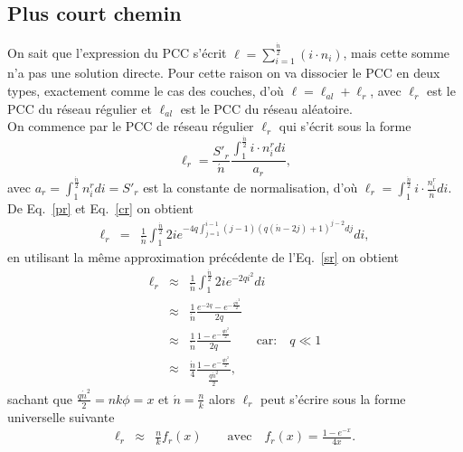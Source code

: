 \subsection{Plus court chemin}
On sait que l'expression du PCC s'écrit  $\ell=\sum_{i=1}^{\frac{\acute{n}}{2}}(i\cdot n_i)$, mais cette somme n'a pas une solution 
directe. Pour cette raison on va dissocier le PCC en deux types, exactement comme le cas des couches, d'où $\ell=\ell_{al}+\ell_r$, avec $\ell_r$ est le PCC du réseau régulier  et $\ell_{al}$ est le PCC du réseau aléatoire.\\
On commence par le PCC de réseau régulier $\ell_r$ qui s'écrit sous la forme 
\begin{equation}
\ell_r=\frac{S'_r}{\acute{n}}\frac{\int_1^{\frac{\acute{n}}{2}}i\cdot n_{i}^{r}di}{a_r},
\end{equation}
avec $a_r=\int_1^{\frac{\acute{n}}{2}}n_{i}^{r}di=S'_r$
est la constante de normalisation, d'où $\ell_r=\int_1^{\frac{\acute{n}}{2}}i\cdot\frac{n_{i}^{r}}{\acute{n}}di$.\\
De Eq.~\eqref{pr} et Eq.~\eqref{cr} on obtient
\begin{eqnarray}
\ell_r&=&\frac{1}{\acute{n}}\int^{\frac{\acute{n}}{2}}_1 2ie^{-4q\int_{j=1}^{i-1}(j-1)(q(\acute{n}-2j)+1)^{j-2}dj}di,\nonumber
\end{eqnarray}
en utilisant la m\^{e}me approximation précédente de l'Eq.~\eqref{sr} on obtient
\begin{eqnarray}
\ell_r &\approx&\frac{1}{\acute{n}}\int_1^{\frac{\acute{n}}{2}}2ie^{-2qi^2}di \\\nonumber
&\approx&\frac{1}{\acute{n}}\frac{e^{-2q}-e^{-\frac{q\acute{n}^2}{2}}}{2q}\\\nonumber
&\approx&\frac{1}{\acute{n}}\frac{1-e^{-\frac{q\acute{n}^2}{2}}}{2q} \quad \quad  \text{car:} \quad q\ll1 \\\nonumber
&\approx&\frac{\acute{n}}{4}\frac{1-e^{-\frac{q\acute{n}^2}{2}}}{\frac{q\acute{n}^2}{2}},\nonumber
\end{eqnarray}
sachant que $\frac{q\acute{n}^2}{2}=nk\phi=x$ et $\acute{n}=\frac{n}{k}$ alors $\ell_r$ peut s'écrire sous la forme universelle suivante
\begin{eqnarray}
\ell_r&\approx&\frac{n}{k}f_r(x) \quad \quad \textrm{avec} \quad f_r(x)=\frac{1-e^{-x}}{4x}.
\label{lr}
\end{eqnarray}

